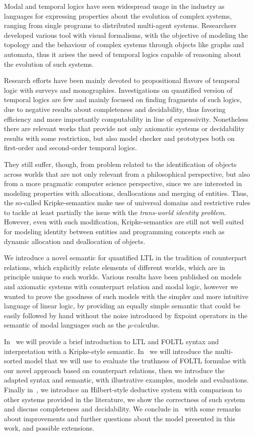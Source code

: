 Modal and temporal logics have seen widespread usage in the industry as languages for expressing properties about the
evolution of complex systems, ranging from single programs to distributed multi-agent systems. Researchers developed
various tool with visual formalisms, with the objective of modeling the topology and the behaviour of complex systems
through objects like graphs and automata, thus it arises the need of temporal logics capable of reasoning about the
evolution of such systems.

Research efforts have been mainly devoted to propositional flavors of temporal logic with surveys and monographies.
Investigations on quantified version of temporal logics are few and mainly focused on finding fragments of such logics,
due to negative results about completeness and decidability, thus favoring efficiency and more importantly computability
in liue of expressivity. Nonetheless there are relevant works that provide not only axiomatic systems or decidability
results with some restriction, but also model checker and prototypes both on first-order and second-order temporal
logics.

They still suffer, though, from problem related to the identification of objects across worlds that are not only
relevant from a philosophical perspective, but also from a more pragmatic computer science perspective, since we are
interested in modeling properties with allocations, deallocations and merging of entities. Thus, the so-called
Kripke-semantics make use of universal domains and restrictive rules to tackle at least partially the issue with the
\emph{trans-world identity problem}. However, even with such modification, Kripke-semantics are still not well suited
for modeling identity between entities and programming concepts such as dynamic allocation and deallocation of objects.

We introduce a novel semantic for quantified \ac{LTL} in the tradition of counterpart relations, which explicitly relate
elements of different worlds, which are in principle unique to such worlds. Various results have been published on
models and axiomatic systems with counterpart relation and modal logic, however we wanted to prove the goodness of such
models with the simpler and more intuitive language of linear logic, by providing an equally simple semantic that could
be easily followed by hand without the noise introduced by fixpoint operators in the semantic of modal languages such as
the $\mu$-calculus.

In~ we will provide a brief introduction to \ac{LTL} and \ac{FOLTL} syntax and interpretation with a
Kripke-style semantic. In~ we will introduce the multi-sorted model that we will use to
evaluate the truthness of \ac{FOLTL} formulae with our novel approach based on counterpart relations, then we
introduce the adapted syntax and semantic, with illustrative examples, models and evaluations. Finally
in~, we introduce an Hilbert-style deductive system with comparison to other systems provided in the
literature, we show the correctness of such system and discuss completeness and decidability. We conclude
in~ with some remarks about improvements and further questions about the model presented in this
work, and possible extensions.
